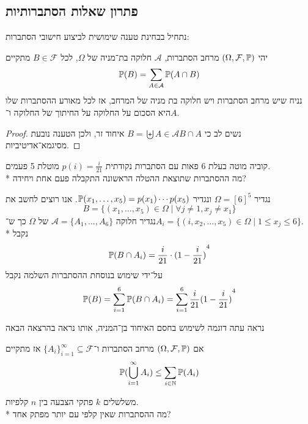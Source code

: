 \subsection{פתרון שאלות הסתברותיות}
נתחיל בבחינת טענה שימושית לביצוע חישובי הסתברות:
\begin{proposition}
	יהי $(\Omega, \mathcal{F}, \mathbb{P})$ מרחב הסתברות, $\mathcal{A}$ חלוקה בת־מניה של $\Omega$, לכל $B \in \mathcal{F}$ מתקיים
	\[
		\mathbb{P}(B) = \sum_{A \in \mathcal{A}} \mathbb{P}(A \cap B)
	\]
	נניח שיש מרחב הסתברות ויש חלוקה בת מניה של המרחב, אז לכל מאורע ההסתברות שלו היא הסכום על החלוקה על החיתוך של החלוקה ו־$A$.
\end{proposition}
\begin{proof}
	נשים לב כי $B = \biguplus{A \in \mathcal{A}} B \cap A$ איחוד זר, ולכן הטענה נובעת מסיגמא־אדיטיביות.
\end{proof}
\begin{exercise}
	קוביה מוטה בעלת 6 פאות עם הסתברות נקודתית $p(i) = \frac{i}{21}$ מוטלת 5 פעמים. \\*
	מה ההסתברות שתוצאת ההטלה הראשונה התקבלה פעם אחת ויחידה?
\end{exercise}
\begin{solution}
	נגדיר $\Omega = {[6]}^5$ ונגדיר $\mathbb{P}(x_1, \dots, x_5) = p(x_1) \cdots p(x_5)$.
	אנו רוצים לחשב את
	\[
		B = \{ (x_1, \dots, x_5) \in \Omega \mid \forall j \ne 1, x_j \ne x_1 \}
	\]
	נגדיר חלוקה $\mathcal{A} = \{ A_1, \dots, A_6 \}$ של $\Omega$ כך ש־$A_i = \{ (i, x_2, \dots, x_5) \in \Omega \mid 1 \le x_j \le 6 \}$. \\*
	נקבל
	\[
		\mathbb{P}(B \cap A_i) = \frac{i}{21} \cdot {(1 - \frac{i}{21})}^4
	\]
	על־ידי שימוש בנוסחת ההסתברות השלמה נקבל
	\[
		\mathbb{P}(B) = \sum_{i = 1}^{6} \mathbb{P}(B \cap A_i) = \sum_{i = 1}^{6} \frac{i}{21} {(1 - \frac{i}{21})}^4
	\]
\end{solution}
נראה עתה דוגמה לשימוש בחסם האיחוד בן־המניה, אותו נראה בהרצאה הבאה
\begin{proposition}
	אם $(\Omega, \mathcal{F}, \mathbb{P})$ מרחב הסתברות ו־${\{A_i\}}_{i = 1}^\infty \subseteq \mathcal{F}$ אז מתקיים
	\[
		\mathbb{P}(\bigcup_{i = 1}^\infty A_i) \le \sum_{i \in \mathbb{N}} \mathbb{P}(A_i)
	\]
\end{proposition}
\begin{exercise}
	משלשלים $k$ פתקי הצבעה בין $n$ קלפיות. \\*
	מה ההסתברות שאין קלפי עם יותר מפתק אחד?
\end{exercise}
